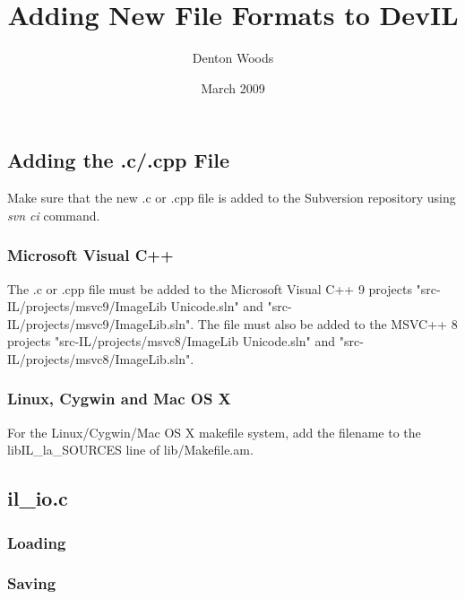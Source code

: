 \documentclass[letterpaper,12pt]{article}
\title{Adding New File Formats to DevIL}
\author{Denton Woods}
\date{March 2009}
\begin{document}
\maketitle

\subsection*{Adding the .c/.cpp File}
Make sure that the new .c or .cpp file is added to the Subversion repository using \emph{svn ci} command.

\subsubsection*{Microsoft Visual C++}
The .c or .cpp file must be added to the Microsoft Visual C++ 9 projects "src-IL/projects/msvc9/ImageLib Unicode.sln" and "src-IL/projects/msvc9/ImageLib.sln".  The file must also be added to the MSVC++ 8 projects "src-IL/projects/msvc8/ImageLib Unicode.sln" and "src-IL/projects/msvc8/ImageLib.sln".

\subsubsection*{Linux, Cygwin and Mac OS X}
For the Linux/Cygwin/Mac OS X makefile system, add the filename to the libIL_la_SOURCES line of lib/Makefile.am.


\subsection*{il_io.c}

\subsubsection*{Loading}

\subsubsection*{Saving}
\end{document}
